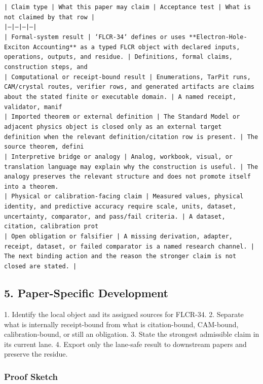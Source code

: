 \documentclass[11pt]{article}
\begin{document}
\noindent\texttt{| Claim type | What this paper may claim | Acceptance test | What is not claimed by that row |}\\
\noindent\texttt{|---|---|---|---|}\\
\noindent\texttt{| Formal-system result | `FLCR-34` defines or uses **Electron-Hole-Exciton Accounting** as a typed FLCR object with declared inputs, operations, outputs, and residue. | Definitions, formal claims, construction steps, and}\\
\noindent\texttt{| Computational or receipt-bound result | Enumerations, TarPit runs, CAM/crystal routes, verifier rows, and generated artifacts are claims about the stated finite or executable domain. | A named receipt, validator, manif}\\
\noindent\texttt{| Imported theorem or external definition | The Standard Model or adjacent physics object is closed only as an external target definition when the relevant definition/citation row is present. | The source theorem, defini}\\
\noindent\texttt{| Interpretive bridge or analogy | Analog, workbook, visual, or translation language may explain why the construction is useful. | The analogy preserves the relevant structure and does not promote itself into a theorem. }\\
\noindent\texttt{| Physical or calibration-facing claim | Measured values, physical identity, and predictive accuracy require scale, units, dataset, uncertainty, comparator, and pass/fail criteria. | A dataset, citation, calibration prot}\\
\noindent\texttt{| Open obligation or falsifier | A missing derivation, adapter, receipt, dataset, or failed comparator is a named research channel. | The next binding action and the reason the stronger claim is not closed are stated. | }\\

\subsection*{5. Paper-Specific Development}

1. Identify the local object and its assigned sources for FLCR-34.
2. Separate what is internally receipt-bound from what is citation-bound, CAM-bound, calibration-bound, or still an obligation.
3. State the strongest admissible claim in its current lane.
4. Export only the lane-safe result to downstream papers and preserve the residue.

\subsubsection*{Proof Sketch}
\end{document}

